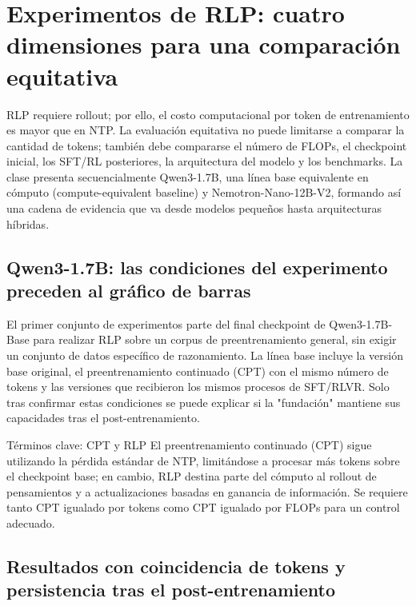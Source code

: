 \section{Experimentos de RLP: cuatro dimensiones para una comparación equitativa}

RLP requiere rollout; por ello, el costo computacional por token de entrenamiento es mayor que en NTP. La evaluación equitativa no puede limitarse a comparar la cantidad de tokens; también debe compararse el número de FLOPs, el checkpoint inicial, los SFT/RL posteriores, la arquitectura del modelo y los benchmarks. La clase presenta secuencialmente Qwen3-1.7B, una línea base equivalente en cómputo (compute-equivalent baseline) y Nemotron-Nano-12B-V2, formando así una cadena de evidencia que va desde modelos pequeños hasta arquitecturas híbridas.

\subsection{Qwen3-1.7B: las condiciones del experimento preceden al gráfico de barras}

El primer conjunto de experimentos parte del final checkpoint de Qwen3-1.7B-Base para realizar RLP sobre un corpus de preentrenamiento general, sin exigir un conjunto de datos específico de razonamiento. La línea base incluye la versión base original, el preentrenamiento continuado (CPT) con el mismo número de tokens y las versiones que recibieron los mismos procesos de SFT/RLVR. Solo tras confirmar estas condiciones se puede explicar si la "fundación" mantiene sus capacidades tras el post-entrenamiento.


\begin{knowledgebox}{Términos clave: CPT y RLP}
El preentrenamiento continuado (CPT) sigue utilizando la pérdida estándar de NTP, limitándose a procesar más tokens sobre el checkpoint base; en cambio, RLP destina parte del cómputo al rollout de pensamientos y a actualizaciones basadas en ganancia de información. Se requiere tanto CPT igualado por tokens como CPT igualado por FLOPs para un control adecuado.
\end{knowledgebox}

\subsection{Resultados con coincidencia de tokens y persistencia tras el post-entrenamiento}

